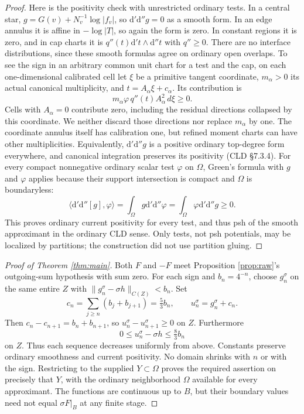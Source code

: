 \documentclass[11pt]{article}
\newcommand{\ddc}{\mathrm d'\mathrm d''}
\begin{document}
\begin{proof}
Here is the positivity check with unrestricted ordinary tests.
In a central star, $g=G(v)+N_v^{-1}\log|f_v|$, so
$\ddc g=0$ as a smooth form. In an edge annulus it is affine
in $-\log|T|$, so again the form is zero. In constant regions
it is zero, and in cap charts it is
$q''(t)\mathrm d't\wedge\mathrm d''t$ with $q''\geq0$.
There are no interface distributions, since these smooth
formulas agree on ordinary open overlaps. To see the sign
in an arbitrary common unit chart for a test and the cap,
on each one-dimensional calibrated cell let $\xi$ be a
primitive tangent coordinate, $m_\alpha>0$ its actual
canonical multiplicity, and $t=A_\alpha\xi+c_\alpha$.
Its contribution is
\[
            m_\alpha\varphi\,q''(t)A_\alpha^2\,d\xi\geq0.
\]
Cells with $A_\alpha=0$ contribute zero, including the
residual directions collapsed by this coordinate. We neither
discard those directions nor replace $m_\alpha$ by one.
The coordinate annulus itself has calibration one, but
refined moment charts can have other multiplicities.
Equivalently, $\ddc g$ is a positive ordinary top-degree
form everywhere, and canonical integration preserves its
positivity (CLD \S7.3.4). For every compact nonnegative
ordinary scalar test $\varphi$ on $\Omega$, Green's formula
with $g$ and $\varphi$ applies because their support
intersection is compact and $\Omega$ is boundaryless:
\[
        \langle\ddc[g],\varphi\rangle
        =\int_\Omega g\ddc\varphi
        =\int_\Omega\varphi\ddc g\geq0.
\]
This proves ordinary current positivity for every test, and
thus psh of the smooth approximant in the ordinary CLD
sense. Only tests, not psh potentials, may be localized by
partitions; the construction did not use partition gluing.
\end{proof}

\begin{proof}[Proof of Theorem \ref{thm:main}]
Both $F$ and $-F$ meet Proposition \ref{prop:raw}'s outgoing-sum
hypothesis with sum zero. For each sign and $b_n=4^{-n}$,
choose $g_n^\sigma$ on the same entire $Z$ with
$\|g_n^\sigma-\sigma h\|_{C(Z)}<b_n$.
Set
\[
 c_n=\sum_{j\geq n}(b_j+b_{j+1})=\tfrac53 b_n,
 \qquad u_n^\sigma=g_n^\sigma+c_n.
\]
Then $c_n-c_{n+1}=b_n+b_{n+1}$, so
$u_n^\sigma-u_{n+1}^\sigma\geq0$ on $Z$.
Furthermore
\[
             0\leq u_n^\sigma-\sigma h\leq\tfrac83 b_n
\]
on $Z$. Thus each sequence decreases uniformly from above.
Constants preserve ordinary smoothness and current positivity.
No domain shrinks with $n$ or with the sign. Restricting to
the supplied $Y\subset\Omega$ proves the required assertion
on precisely that $Y$, with the ordinary neighborhood
$\Omega$ available for every approximant. The functions are
continuous up to $B$, but their boundary values need not
equal $\sigma F|_B$ at any finite stage.
\end{proof}
\end{document}
